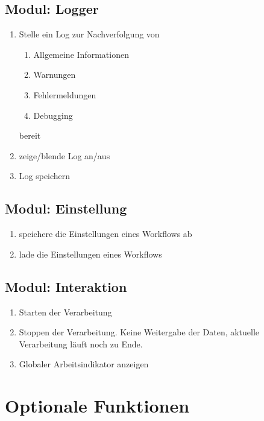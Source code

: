 	\subsection{Modul: Logger}
		\begin{enumerate}[ align=left, label={\textbf{\textbackslash FM4\arabic*0\textbackslash}} ]
			\item Stelle ein Log zur Nachverfolgung von
			\begin{enumerate}[ align=left, label={\textbf{\textbackslash FM41\arabic*\textbackslash}} ]
			\item Allgemeine Informationen
			\item Warnungen
			\item Fehlermeldungen
			\item Debugging
		\end{enumerate}
		bereit
		\item zeige/blende Log an/aus
		\item Log speichern
	\end{enumerate}

	\subsection{Modul: Einstellung}
		\begin{enumerate}[ align=left, label={\textbf{\textbackslash FM5\arabic*0\textbackslash}} ]
			\item speichere die Einstellungen eines Workflows ab
			\item lade die Einstellungen eines Workflows
		\end{enumerate}

	\subsection{Modul: Interaktion}
		\begin{enumerate}[ align=left, label={\textbf{\textbackslash FM6\arabic*0\textbackslash}} ]
			\item Starten der Verarbeitung
			\item Stoppen der Verarbeitung. Keine Weitergabe der Daten, aktuelle Verarbeitung läuft noch zu Ende.
			\item Globaler Arbeitsindikator anzeigen
		\end{enumerate}	

\section{Optionale Funktionen}
